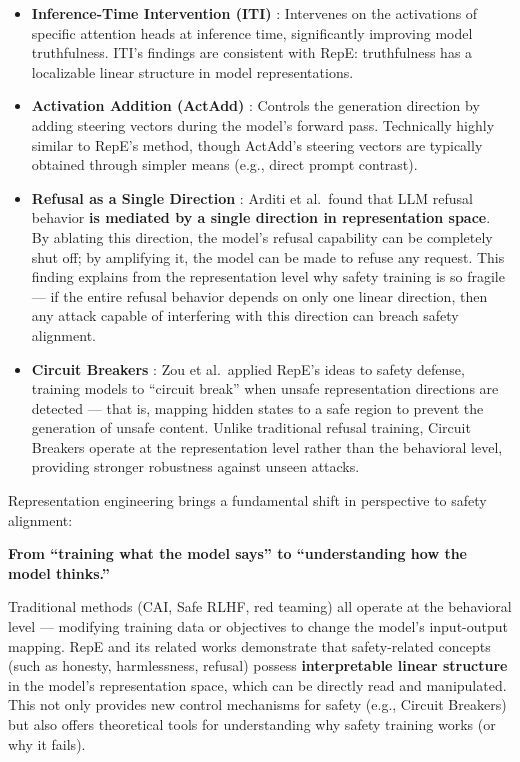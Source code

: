 \begin{itemize}[leftmargin=2em]
  \item \textbf{Inference-Time Intervention (ITI)} \cite{li2023iti}:
    Intervenes on the activations of specific attention heads at inference time,
    significantly improving model truthfulness.
    ITI's findings are consistent with RepE: truthfulness has a localizable linear structure in model representations.

  \item \textbf{Activation Addition (ActAdd)} \cite{turner2023actadd}:
    Controls the generation direction by adding steering vectors during the model's forward pass.
    Technically highly similar to RepE's method, though ActAdd's steering vectors
    are typically obtained through simpler means (e.g., direct prompt contrast).

  \item \textbf{Refusal as a Single Direction} \cite{arditi2024refusal}:
    Arditi et al.\ found that LLM refusal behavior
    \textbf{is mediated by a single direction in representation space}.
    By ablating this direction, the model's refusal capability can be completely shut off;
    by amplifying it, the model can be made to refuse any request.
    This finding explains from the representation level why safety training is so fragile ---
    if the entire refusal behavior depends on only one linear direction,
    then any attack capable of interfering with this direction can breach safety alignment.

  \item \textbf{Circuit Breakers} \cite{zou2024circuitbreakers}:
    Zou et al.\ applied RepE's ideas to safety defense,
    training models to ``circuit break'' when unsafe representation directions are detected ---
    that is, mapping hidden states to a safe region to prevent the generation of unsafe content.
    Unlike traditional refusal training, Circuit Breakers operate at the representation level rather than the behavioral level,
    providing stronger robustness against unseen attacks.
\end{itemize}

\begin{solutionbox}
Representation engineering brings a fundamental shift in perspective to safety alignment:

\textbf{From ``training what the model says'' to ``understanding how the model thinks.''}

Traditional methods (CAI, Safe RLHF, red teaming) all operate at the behavioral level ---
modifying training data or objectives to change the model's input-output mapping.
RepE and its related works demonstrate that safety-related concepts (such as honesty, harmlessness, refusal)
possess \textbf{interpretable linear structure} in the model's representation space,
which can be directly read and manipulated.
This not only provides new control mechanisms for safety (e.g., Circuit Breakers)
but also offers theoretical tools for understanding why safety training works (or why it fails).
\end{solutionbox}

